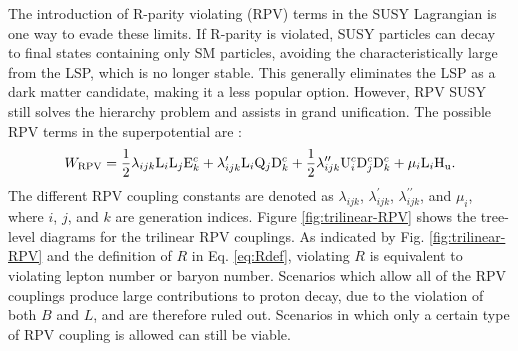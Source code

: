 The introduction of R-parity violating (RPV) terms in the SUSY Lagrangian is one way to evade these limits. If R-parity is violated, SUSY particles can decay to final states containing only SM particles, avoiding the characteristically large \met from the LSP, which is no longer stable. This generally eliminates the LSP as a dark matter candidate, making it a less popular option. However, RPV SUSY still solves the hierarchy problem and assists in grand unification. The possible RPV terms in the superpotential are \cite{Barbier}:
\begin{equation}
W_{\text{RPV}} = \frac{1}{2}\lambda_{ijk}\mathrm{L}_{i}\mathrm{L}_{j}\mathrm{E}_{k}^{c} + \lambda_{ijk}^{\prime}\mathrm{L}_{i}\mathrm{Q}_{j}\mathrm{D}_{k}^{c} + \frac{1}{2}\lambda_{ijk}^{\prime \prime}\mathrm{U}_{i}^{c}\mathrm{D}_{j}^{c}\mathrm{D}_{k}^{c} + \mu_{i}\mathrm{L}_{i}\mathrm{H}_\mathrm{u}. \label{eq:WRPV}
\end{equation}
The different RPV coupling constants are denoted as $\lambda_{ijk}$, $\lambda^{\prime}_{ijk}$, $\lambda^{\prime \prime}_{ijk}$, and $\mu_{i}$, where $i$, $j$, and $k$ are generation indices. Figure \ref{fig:trilinear-RPV} shows the tree-level diagrams for the trilinear RPV couplings. As indicated by Fig. \ref{fig:trilinear-RPV} and the definition of $R$ in Eq. \eqref{eq:Rdef}, violating $R$ is equivalent to violating lepton number or baryon number. Scenarios which allow all of the RPV couplings produce large contributions to proton decay, due to the violation of both $B$ and $L$, and are therefore ruled out. Scenarios in which only a certain type of RPV coupling is allowed can still be viable.

